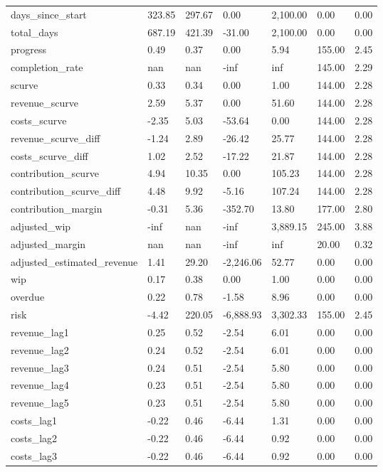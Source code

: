 \begin{landscape}
\begin{longtable}[h!]{lllllll}
days_since_start & 323.85 & 297.67 & 0.00 & 2,100.00 & 0.00 & 0.00 \\
total_days & 687.19 & 421.39 & -31.00 & 2,100.00 & 0.00 & 0.00 \\
progress & 0.49 & 0.37 & 0.00 & 5.94 & 155.00 & 2.45 \\
completion_rate & nan & nan & -inf & inf & 145.00 & 2.29 \\
scurve & 0.33 & 0.34 & 0.00 & 1.00 & 144.00 & 2.28 \\
revenue_scurve & 2.59 & 5.37 & 0.00 & 51.60 & 144.00 & 2.28 \\
costs_scurve & -2.35 & 5.03 & -53.64 & 0.00 & 144.00 & 2.28 \\
revenue_scurve_diff & -1.24 & 2.89 & -26.42 & 25.77 & 144.00 & 2.28 \\
costs_scurve_diff & 1.02 & 2.52 & -17.22 & 21.87 & 144.00 & 2.28 \\
contribution_scurve & 4.94 & 10.35 & 0.00 & 105.23 & 144.00 & 2.28 \\
contribution_scurve_diff & 4.48 & 9.92 & -5.16 & 107.24 & 144.00 & 2.28 \\
contribution_margin & -0.31 & 5.36 & -352.70 & 13.80 & 177.00 & 2.80 \\
adjusted_wip & -inf & nan & -inf & 3,889.15 & 245.00 & 3.88 \\
adjusted_margin & nan & nan & -inf & inf & 20.00 & 0.32 \\
adjusted_estimated_revenue & 1.41 & 29.20 & -2,246.06 & 52.77 & 0.00 & 0.00 \\
wip & 0.17 & 0.38 & 0.00 & 1.00 & 0.00 & 0.00 \\
overdue & 0.22 & 0.78 & -1.58 & 8.96 & 0.00 & 0.00 \\
risk & -4.42 & 220.05 & -6,888.93 & 3,302.33 & 155.00 & 2.45 \\
revenue_lag1 & 0.25 & 0.52 & -2.54 & 6.01 & 0.00 & 0.00 \\
revenue_lag2 & 0.24 & 0.52 & -2.54 & 6.01 & 0.00 & 0.00 \\
revenue_lag3 & 0.24 & 0.51 & -2.54 & 5.80 & 0.00 & 0.00 \\
revenue_lag4 & 0.23 & 0.51 & -2.54 & 5.80 & 0.00 & 0.00 \\
revenue_lag5 & 0.23 & 0.51 & -2.54 & 5.80 & 0.00 & 0.00 \\
costs_lag1 & -0.22 & 0.46 & -6.44 & 1.31 & 0.00 & 0.00 \\
costs_lag2 & -0.22 & 0.46 & -6.44 & 0.92 & 0.00 & 0.00 \\
costs_lag3 & -0.22 & 0.46 & -6.44 & 0.92 & 0.00 & 0.00 \\

\end{longtable}
\end{landscape}
